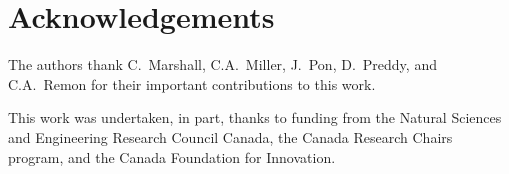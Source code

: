 \documentclass[aps,prab,twocolumn,superscriptaddress]{revtex4-1}
\begin{document}
%

\section*{Acknowledgements}

The authors thank C.~Marshall, C.A.~Miller, J.~Pon, D.~Preddy, and C.A.~Remon for their important contributions to this work.

This work was undertaken, in part, thanks to funding from the Natural
Sciences and Engineering Research Council Canada, the Canada Research
Chairs program, and the Canada Foundation for Innovation.


\end{document}
